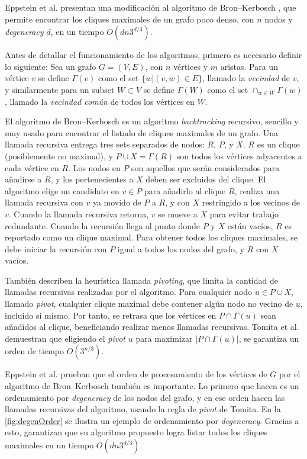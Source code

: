 Eppstein et al. \cite{eppstein2010listing} presentan una modificación al algoritmo de Bron–Kerbosch \cite{bron1973algorithm}, que permite encontrar los cliques maximales de un grafo poco denso, con $n$ nodos y \textit{degeneracy} $d$, en un tiempo $O(dn3^{d/3})$.

Antes de detallar el funcionamiento de los algoritmos, primero es necesario definir lo siguiente: Sea un grafo $G = (V, E)$, con $n$ vértices y $m$ aristas. Para un vértice $v$ se define $\Gamma(v)$ como el set $\{w | (v, w) \in E\}$, llamado la \textit{vecindad} de $v$, y similarmente para un subset $W \subset V$ se define $\Gamma(W)$ como el set $\cap_{w \in W} \Gamma(w)$, llamado la \textit{vecindad común} de todos los vértices en $W$.

El algoritmo de Bron–Kerbosch \cite{bron1973algorithm} es un algoritmo \textit{backtracking} recursivo, sencillo y muy usado para encontrar el listado de cliques maximales de un grafo. Una llamada recursiva entrega tres sets separados de nodos: $R$, $P$, y $X$. $R$ es un clique (posiblemente no maximal), y $P \cup X = \Gamma(R)$ son todos los vértices adyacentes a cada vértice en $R$. Los nodos en $P$ son aquellos que serán considerados para añadirse a $R$, y los pertenecientes a $X$ deben ser excluidos del clique. El algoritmo elige un candidato en $v \in P$ para añadirlo al clique $R$, realiza una llamada recursiva con $v$ ya movido de $P$ a $R$, y con $X$ restringido a los vecinos de $v$. Cuando la llamada recursiva retorna, $v$ se mueve a $X$ para evitar trabajo redundante. Cuando la recursión llega al punto donde $P$ y $X$ están vacíos, $R$ es reportado como un clique maximal. Para obtener todos los cliques maximales, se debe iniciar la recursión con $P$ igual a todos los nodos del grafo, y $R$ con $X$ vacíos.

También describen la heurística llamada \textit{pivoting}, que limita la cantidad de llamadas recursivas realizadas por el algoritmo. Para cualquier nodo $u \in P \cup X$, llamado \textit{pivot}, cualquier clique maximal debe contener algún nodo no vecino de $u$, incluido si mismo. Por tanto, se retrasa que los vértices en $P \cap \Gamma(u)$ sean añadidos al clique, beneficiando realizar menos llamadas recursivas. Tomita et al. \cite{tomita2006worst} demuestran que eligiendo el \textit{pivot} $u$ para maximizar $|P \cap \Gamma(u)|$, se garantiza un orden de tiempo $O(3^{n/3})$.

Eppstein et al. \cite{eppstein2010listing} prueban que el orden de procesamiento de los vértices de $G$ por el algoritmo de Bron–Kerbosch también es importante. Lo primero que hacen es un ordenamiento por \textit{degeneracy} de los nodos del grafo, y en ese orden hacen las llamadas recursivas del algoritmo, usando la regla de \textit{pivot} de Tomita. En la \autoref{fig:degenOrder} se ilustra un ejemplo de ordenamiento por \textit{degeneracy}. Gracias a esto, garantizan que su algoritmo propuesto logra listar todos los cliques maximales en un tiempo $O(dn3^{d/3})$.



